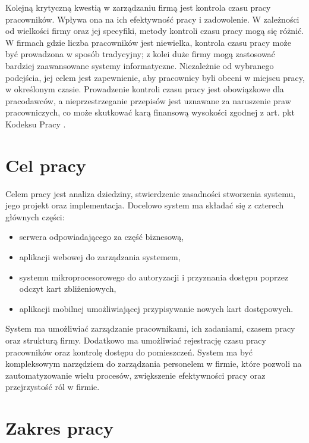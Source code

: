 Kolejną krytyczną kwestią w zarządzaniu firmą jest kontrola czasu pracy pracowników. Wpływa ona na ich efektywność pracy i zadowolenie. W zależności od wielkości firmy oraz jej specyfiki, metody kontroli czasu pracy mogą się różnić. W firmach gdzie liczba pracowników jest niewielka, kontrola czasu pracy może być prowadzona w sposób tradycyjny; z kolei duże firmy mogą zastosować bardziej zaawansowane systemy informatyczne. Niezależnie od wybranego podejścia, jej celem jest zapewnienie, aby pracownicy byli obecni w miejscu pracy, w określonym czasie. Prowadzenie kontroli czasu pracy jest obowiązkowe dla pracodawców, a nieprzestrzeganie przepisów jest uznawane za naruszenie praw pracowniczych, co może skutkować karą finansową wysokości zgodnej z art.  pkt  Kodeksu Pracy \cite{bib:KodeksPracy}.

\section{Cel pracy}


Celem pracy jest analiza dziedziny, stwierdzenie zasadności stworzenia systemu, jego projekt oraz implementacja. Docelowo system ma składać się z czterech głównych części:

\begin{itemize}
    \item serwera odpowiadającego za część biznesową,
    \item aplikacji webowej do zarządzania systemem,
    \item systemu mikroprocesorowego do autoryzacji i przyznania dostępu poprzez odczyt kart zbliżeniowych,
    \item aplikacji mobilnej umożliwiającej przypisywanie nowych kart dostępowych.
\end{itemize}

System ma umożliwiać zarządzanie pracownikami, ich zadaniami, czasem pracy oraz strukturą firmy. Dodatkowo ma umożliwiać rejestrację czasu pracy pracowników oraz kontrolę dostępu do pomieszczeń. System ma być kompleksowym narzędziem do zarządzania personelem w firmie, które pozwoli na zautomatyzowanie wielu procesów, zwiększenie efektywności pracy oraz przejrzystość ról w firmie.

\section{Zakres pracy}

